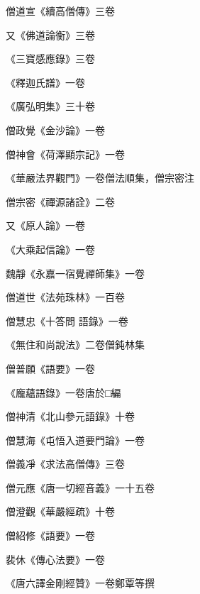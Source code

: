 \begin{pinyinscope}
 僧道宣《續高僧傳》三卷



 又《佛道論衡》三卷



 《三寶感應錄》三卷



 《釋迦氏譜》一卷



 《廣弘明集》三十卷



 僧政覺《金沙論》一卷



 僧神會《荷澤顯宗記》一卷



 《華嚴法界觀門》一卷僧法順集，僧宗密注



 僧宗密《禪源諸詮》二卷



 又《原人論》一卷



 《大乘起信論》一卷



 魏靜《永嘉一宿覺禪師集》一卷



 僧道世《法苑珠林》一百卷



 僧慧忠《十答問
 語錄》一卷



 《無住和尚說法》二卷僧鈍林集



 僧普願《語要》一卷



 《龐蘊語錄》一卷唐於□編



 僧神清《北山參元語錄》十卷



 僧慧海《屯悟入道要門論》一卷



 僧義凈《求法高僧傳》三卷



 僧元應《唐一切經音義》一十五卷



 僧澄觀《華嚴經疏》十卷



 僧紹修《語要》一卷



 裴休《傳心法要》一卷



 《唐六譯金剛經贊》一卷鄭覃等撰




\end{pinyinscope}
